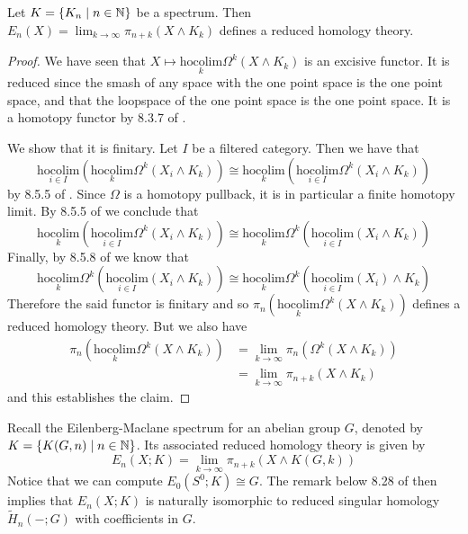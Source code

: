 \begin{thm}\label{thm:SpecHomology} Let $K=\{K_n\;|\;n\in\mathbb{N}\}$ be a spectrum. Then $E_n(X)=\lim_{k\to\infty}\pi_{n+k}(X\wedge K_k)$ defines a reduced homology theory. 
\begin{proof}
We have seen that $X\mapsto\underset{k}{\text{hocolim}}\Omega^k(X\wedge K_k)$ is an excisive functor. It is reduced since the smash of any space with the one point space is the one point space, and that the loopspace of the one point space is the one point space. It is a homotopy functor by 8.3.7 of \cite{CHT}. 

We show that it is finitary. Let $I$ be a filtered category. Then we have that $$\underset{i\in I}{\text{hocolim}}(\underset{k}{\text{hocolim}}\Omega^k(X_i\wedge K_k))\cong\underset{k}{\text{hocolim}}(\underset{i\in I}{\text{hocolim}}\Omega^k(X_i\wedge K_k))$$ by 8.5.5 of \cite{CHT}. Since $\Omega$ is a homotopy pullback, it is in particular a finite homotopy limit. By 8.5.5 of \cite{CHT} we conclude that $$\underset{k}{\text{hocolim}}(\underset{i\in I}{\text{hocolim}}\Omega^k(X_i\wedge K_k))\cong\underset{k}{\text{hocolim}}\Omega^k(\underset{i\in I}{\text{hocolim}}(X_i\wedge K_k))$$ Finally, by 8.5.8 of \cite{CHT} we know that $$\underset{k}{\text{hocolim}}\Omega^k(\underset{i\in I}{\text{hocolim}}(X_i\wedge K_k))\cong\underset{k}{\text{hocolim}}\Omega^k(\underset{i\in I}{\text{hocolim}}(X_i)\wedge K_k)$$ Therefore the said functor is finitary and so $\pi_n(\underset{k}{\text{hocolim}}\Omega^k(X\wedge K_k))$ defines a reduced homology theory. But we also have
\begin{align*}
\pi_n(\underset{k}{\text{hocolim}}\Omega^k(X\wedge K_k))&=\lim_{k\to\infty}\pi_n(\Omega^k(X\wedge K_k))\\
&=\lim_{k\to\infty}\pi_{n+k}(X\wedge K_k)
\end{align*}
and this establishes the claim. 
\end{proof}
\end{thm}

\begin{eg}\label{eg:EMSpec} Recall the Eilenberg-Maclane spectrum for an abelian group $G$, denoted by $K=\{K(G,n)\;|\;n\in\mathbb{N}\}$. Its associated reduced homology theory is given by $$E_n(X;K)=\lim_{k\to\infty}\pi_{n+k}(X\wedge K(G,k))$$ Notice that we can compute $E_0(S^0;K)\cong G$. The remark below 8.28 of \cite{LNAT} then implies that $E_n(X;K)$ is naturally isomorphic to reduced singular homology $\widetilde{H}_n(-;G)$ with coefficients in $G$. 
\end{eg}

